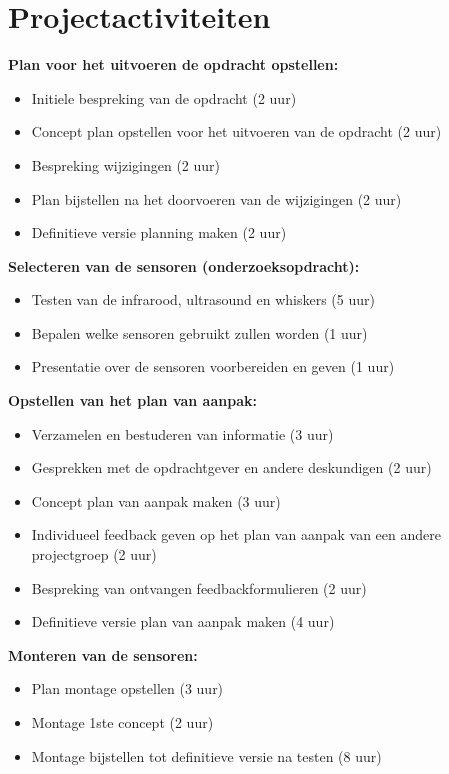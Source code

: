 \documentclass[oneside]{book}
\begin{document}
\chapter{Projectactiviteiten}
{\large \textbf{ Plan voor het uitvoeren de opdracht opstellen:}}
\begin{itemize}
\item Initiele bespreking van de opdracht (2 uur)
\item Concept plan opstellen voor het uitvoeren van de opdracht (2 uur)
\item Bespreking wijzigingen (2 uur)
\item Plan bijstellen na het doorvoeren van de wijzigingen (2 uur)
\item Definitieve versie planning maken (2 uur)
\end{itemize}

{\large \textbf{Selecteren van de sensoren (onderzoeksopdracht):}}
\begin{itemize}
\item Testen van de infrarood, ultrasound en whiskers (5 uur)
\item Bepalen welke sensoren gebruikt zullen worden (1 uur)
\item Presentatie over de sensoren voorbereiden en geven (1 uur)
\end{itemize}

{\large \textbf{Opstellen van het plan van aanpak:}}
\begin{itemize}
\item Verzamelen en bestuderen van informatie (3 uur)
\item Gesprekken met de opdrachtgever en andere deskundigen (2 uur)
\item Concept plan van aanpak maken (3 uur)
\item Individueel feedback geven op het plan van aanpak van een andere projectgroep  (2 uur)
\item Bespreking van ontvangen feedbackformulieren (2 uur)
\item Definitieve versie plan van aanpak maken (4 uur)
\end{itemize}

{\large \textbf{Monteren van de sensoren:}}
\begin{itemize}
\item Plan montage opstellen (3 uur)
\item Montage 1ste concept (2 uur)
\item Montage bijstellen tot definitieve versie na testen (8 uur)
\end{itemize}
\end{document}
